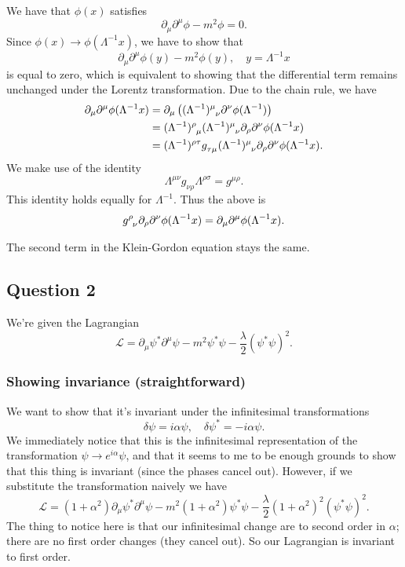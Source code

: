 \documentclass[11pt, oneside]{article}   	%
\theoremstyle{newline}
\theoremstyle{newline}
\theoremstyle{newline}
\theoremstyle{newline}
\theoremstyle{newline}
\newcommand{\Lagr}{\mathcal{L}}
\begin{document}
We have that $\phi(x)$ satisfies 
\[
\partial_{\mu}\partial^{\mu} \phi - m^{2} \phi  = 0. 
\]
Since $\phi(x) \rightarrow \phi(\Lambda^{-1} x)$, we have to show that
\[ 
\partial_{\mu}\partial^{\mu} \phi(y) - m^2 \phi(y), \quad y = \Lambda^{-1} x  
\] 
is equal to zero, which is equivalent to showing that the differential term remains unchanged under the Lorentz transformation. 
Due to the chain rule, we have 
\begin{align*}
\partial_{\mu} \partial^{\mu} \phi(\Lambda^{-1}x) &= \partial_{\mu} \left( (\Lambda^{-1})\indices{^\mu_\nu} \partial^{\nu} \phi(\Lambda^{-1}) \right) \\ 
&= (\Lambda^{-1})\indices{^\rho_\mu} (\Lambda^{-1})\indices{^\mu_\nu}  \partial_{\rho} \partial^{\nu} \phi(\Lambda^{-1} x) \\
&= (\Lambda^{-1})\indices{^\rho^\tau} g\indices{_\tau_\mu} (\Lambda^{-1})\indices{^\mu_\nu} \partial_{\rho} \partial^{\nu} \phi(\Lambda^{-1}x). 
\end{align*}
We make use of the identity
\[
\Lambda^{\mu \nu} g_{\nu \rho} \Lambda^{\rho \sigma} = g^{\mu \rho}. 
\]
This identity holds equally for $\Lambda^{-1}$. Thus the above is 
\[
g\indices{^\rho_\nu} \partial_{\rho} \partial^{\nu} \phi(\Lambda^{-1}x) = \partial_{\mu}\partial^{\mu} \phi(\Lambda^{-1}x). 
\]

The second term in the Klein-Gordon equation stays the same. 


\pagebreak
\subsection{Question 2}
We're given the Lagrangian
\[
\Lagr = \partial_{\mu} \psi^{*} \partial^\mu \psi - m^2 \psi^* \psi - \frac{\lambda}{2} \left( \psi^* \psi \right)^2. 
\]

\subsubsection*{Showing invariance (straightforward)}
We want to show that it's invariant under the infinitesimal transformations 
\[
\delta \psi = i \alpha \psi, \quad \delta \psi^* = - i \alpha \psi. 
\]
We immediately notice that this is the infinitesimal representation of the transformation $\psi \rightarrow e^{i \alpha} \psi$, and that it seems to me to be enough grounds to show that this thing is invariant (since the phases cancel out). However, if we substitute the transformation naively we have
\[
\Lagr = (1 + \alpha^2) \partial_\mu \psi^* \partial^\mu \psi - m^2 (1 + \alpha^2) \psi^* \psi - \frac{\lambda}{2} (1 + \alpha^2)^2 \left( \psi^* \psi\right)^2. 
\]
The thing to notice here is that our infinitesimal change are to second order in $\alpha$; there are no first order changes (they cancel out). So our Lagrangian is invariant to first order. 
\end{document}
